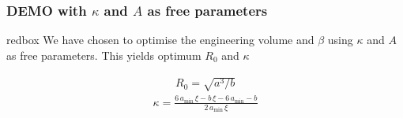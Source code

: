 \documentclass[hyperref={colorlinks=true,urlcolor=blue,linkcolor=.},aspectratio=1610,mathserif]{beamer}
\begin{document}
\begin{frame}
	\frametitle{DEMO with $\kappa$ and $A$ as free parameters}
\begin{centering}
		\begin{beamercolorbox}[sep=1em,wd=8cm]{redbox}
              We have chosen to optimise the engineering volume and $\beta$ using $\kappa$ and $A$ as free parameters. This yields optimum $R_{0}$ and $\kappa$
              \end{beamercolorbox}
        \end{centering}
        \begin{align}
            R_{0}=\sqrt{a^{3}/b}
        \end{align}
        \begin{align}
            \kappa=\frac{6\, a_{\min}\,\xi-b\,\xi-6\, a_{\min}-b}{2\, a_{\min}\,\xi}
        \end{align}
\end{frame}
\end{document}
